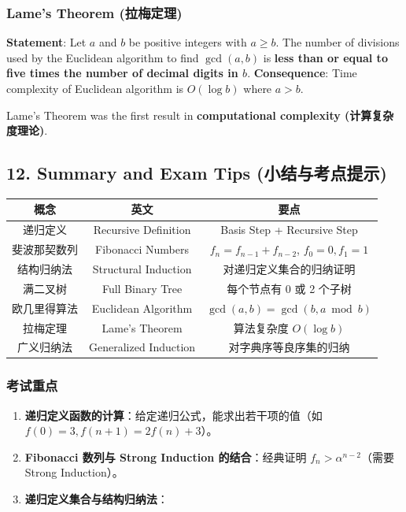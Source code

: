 \documentclass[10pt,a4paper,openany]{ctexbook}
\theoremstyle{definition}
\theoremstyle{remark}
\renewenvironment{quote}
  {\list{}{\leftmargin=1em\rightmargin=0pt\topsep=0.5pt\partopsep=0pt}\item[]}
  {\endlist}
\begin{document}
\subsubsection{Lame's Theorem (拉梅定理)}

\textbf{Statement}: Let $a$ and $b$ be positive integers with $a \ge b$. The number of divisions used by the Euclidean algorithm to find $\gcd(a, b)$ is \textbf{less than or equal to five times the number of decimal digits in $b$}.
\textbf{Consequence}: Time complexity of Euclidean algorithm is $O(\log b)$ where $a > b$.
\begin{quote}
Lame's Theorem was the first result in \textbf{computational complexity (计算复杂度理论)}.

\end{quote}
\vspace{-2pt}

\subsection{12. Summary and Exam Tips (小结与考点提示)}

\begin{center}
\begin{tabular}{ccc}
\hline
概念 & 英文 & 要点 \\ \hline
递归定义 & Recursive Definition & Basis Step + Recursive Step \\
斐波那契数列 & Fibonacci Numbers & $f_n = f_{n-1} + f_{n-2}$, $f_0 = 0, f_1 = 1$ \\
结构归纳法 & Structural Induction & 对递归定义集合的归纳证明 \\
满二叉树 & Full Binary Tree & 每个节点有 0 或 2 个子树 \\
欧几里得算法 & Euclidean Algorithm & $\gcd(a,b) = \gcd(b, a \bmod b)$ \\
拉梅定理 & Lame's Theorem & 算法复杂度 $O(\log b)$ \\
广义归纳法 & Generalized Induction & 对字典序等良序集的归纳 \\
\hline
\end{tabular}

\end{center}

\subsubsection{考试重点}

\begin{enumerate}
\item \textbf{递归定义函数的计算}：给定递归公式，能求出若干项的值（如 $f(0)=3, f(n+1)=2f(n)+3$）。

\item \textbf{Fibonacci 数列与 Strong Induction 的结合}：经典证明 $f_n > \alpha^{n-2}$（需要 Strong Induction）。

\item \textbf{递归定义集合与结构归纳法}：
\end{enumerate}
\end{document}
